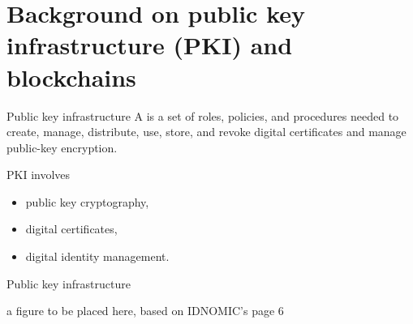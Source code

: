 \section[PKI and blockchains]{Background on public key infrastructure (PKI) and blockchains}

\begin{frame}{Public key infrastructure}
A  is a set of roles, policies, and procedures needed to create, manage, distribute, use, store, and revoke digital certificates and manage public-key encryption.

\vspace{2mm}

PKI involves
\begin{itemize}
\item public key cryptography,
\item digital certificates,
\item digital identity management.
\end{itemize}

\end{frame}


\begin{frame}{Public key infrastructure}
\begin{figure}[t]
\end{figure}

a figure to be placed here, based on IDNOMIC's page 6
\end{frame}


